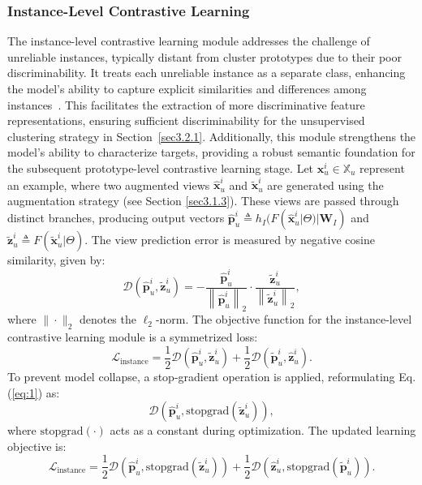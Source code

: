 \subsubsection{Instance-Level Contrastive Learning}\label{sec3.1.1}
The instance-level contrastive learning module addresses the challenge of unreliable instances, typically distant from cluster prototypes due to their poor discriminability.  
It treats each unreliable instance as a separate class, enhancing the model's ability to capture explicit similarities and differences among instances~\cite{Wu2018}.  
This facilitates the extraction of more discriminative feature representations, ensuring sufficient discriminability for the unsupervised clustering strategy in Section~\ref{sec3.2.1}.  
Additionally, this module strengthens the model's ability to characterize targets, providing a robust semantic foundation for the subsequent prototype-level contrastive learning stage.
Let $\bm{x}_{u}^{i} \in \mathbb{X}_{u}$ represent an example, where two augmented views $\hat{\bm{x}}_{u}^{i}$ and $\tilde{\bm{x}}_{u}^{i}$ are generated using the augmentation strategy (see Section \ref{sec3.1.3}). These views are passed through distinct branches, producing output vectors $\bm{\hat{\bm{p}}}^{i}_{u} \triangleq h_{I}(F(\hat{\bm{x}}_{u}^{i}|\Theta)|\bm{W}_I)$ and $\tilde{\bm{z}}_{u}^{i} \triangleq F(\tilde{\bm{x}}_{u}^{i}|\Theta)$. The view prediction error is measured by negative cosine similarity, given by:
\begin{equation}\label{eq:1}
    \mathcal{D}\left(\bm{\hat{\bm{p}}}^{i}_{u}, \tilde{\bm{z}}_{u}^{i}\right) = -\frac{\bm{\hat{\bm{p}}}^{i}_{u}}{\left\|\bm{\hat{\bm{p}}}^{i}_{u}\right\|_2} \cdot \frac{\tilde{\bm{z}}_{u}^{i}}{\left\|\tilde{\bm{z}}_{u}^{i}\right\|_2},
\end{equation}
where $\|\cdot\|_2$ denotes the $\ell_2$-norm. The objective function for the instance-level contrastive learning module is a symmetrized loss:
\begin{equation}\label{eq:2}
    \mathcal{L}_{\text{instance}} = \frac{1}{2} \mathcal{D}\left(\bm{\hat{\bm{p}}}^{i}_{u}, \tilde{\bm{z}}_{u}^{i}\right) + \frac{1}{2} \mathcal{D}\left(\bm{\tilde{\bm{p}}}^{i}_{u}, \hat{\bm{z}}_{u}^{i}\right).
\end{equation}
To prevent model collapse, a stop-gradient operation is applied, reformulating Eq. (\ref{eq:1}) as:
\begin{equation}\label{eq:3}     
    \mathcal{D}\left(\bm{\hat{\bm{p}}}^{i}_{u}, \text{stopgrad}(\tilde{\bm{z}}_{u}^{i})\right),
\end{equation}
where $\text{stopgrad}(\cdot)$ acts as a constant during optimization. The updated learning objective is:
\begin{equation}\label{eq:4}
    \mathcal{L}_{\text{instance}} = \frac{1}{2} \mathcal{D}\left(\bm{\hat{\bm{p}}}^{i}_{u}, \text{stopgrad}(\tilde{\bm{z}}_{u}^{i})\right) + \frac{1}{2} \mathcal{D}\left(\bm{\hat{\bm{z}}}^{i}_{u}, \text{stopgrad}(\tilde{\bm{p}}_{u}^{i})\right).
\end{equation}

